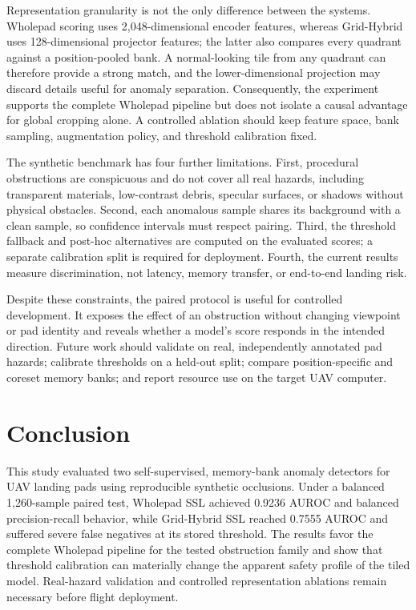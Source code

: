 Representation granularity is not the only difference between the systems. Wholepad scoring uses 2,048-dimensional encoder features, whereas Grid-Hybrid uses 128-dimensional projector features; the latter also compares every quadrant against a position-pooled bank. A normal-looking tile from any quadrant can therefore provide a strong match, and the lower-dimensional projection may discard details useful for anomaly separation. Consequently, the experiment supports the complete Wholepad pipeline but does not isolate a causal advantage for global cropping alone. A controlled ablation should keep feature space, bank sampling, augmentation policy, and threshold calibration fixed.

The synthetic benchmark has four further limitations. First, procedural obstructions are conspicuous and do not cover all real hazards, including transparent materials, low-contrast debris, specular surfaces, or shadows without physical obstacles. Second, each anomalous sample shares its background with a clean sample, so confidence intervals must respect pairing. Third, the threshold fallback and post-hoc alternatives are computed on the evaluated scores; a separate calibration split is required for deployment. Fourth, the current results measure discrimination, not latency, memory transfer, or end-to-end landing risk.

Despite these constraints, the paired protocol is useful for controlled development. It exposes the effect of an obstruction without changing viewpoint or pad identity and reveals whether a model's score responds in the intended direction. Future work should validate on real, independently annotated pad hazards; calibrate thresholds on a held-out split; compare position-specific and coreset memory banks; and report resource use on the target UAV computer.

\section{Conclusion}
This study evaluated two self-supervised, memory-bank anomaly detectors for UAV landing pads using reproducible synthetic occlusions. Under a balanced 1,260-sample paired test, Wholepad SSL achieved 0.9236 AUROC and balanced precision-recall behavior, while Grid-Hybrid SSL reached 0.7555 AUROC and suffered severe false negatives at its stored threshold. The results favor the complete Wholepad pipeline for the tested obstruction family and show that threshold calibration can materially change the apparent safety profile of the tiled model. Real-hazard validation and controlled representation ablations remain necessary before flight deployment.

